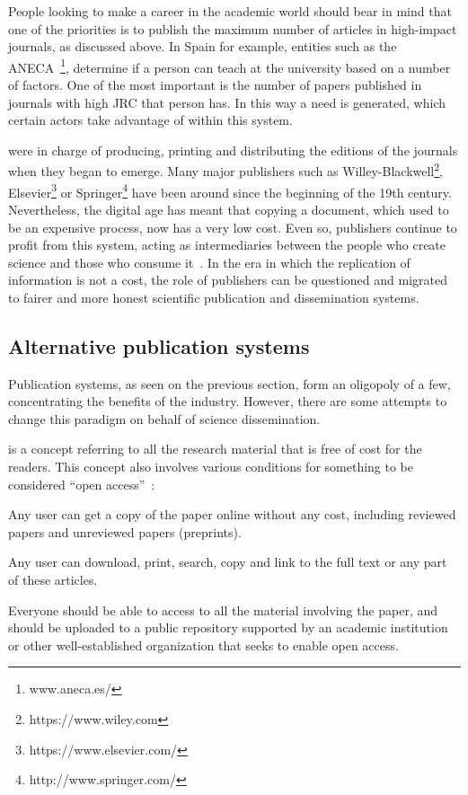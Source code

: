 People looking to make a career in the academic world should bear in mind that
one of the priorities is to publish the maximum number of articles in
high-impact journals, as discussed above. In Spain for example, entities such as
the ANECA~\footnote{www.aneca.es/}, determine if a person can teach at the
university based on a number of factors. One of the most important is the number
of papers published in journals with high JRC that person has. In this way a
need is generated, which certain actors take advantage of within this system.

 were in charge of producing, printing and distributing the
editions of the journals when they began to emerge. Many major publishers such
as Willey-Blackwell\footnote{https://www.wiley.com},
Elsevier\footnote{https://www.elsevier.com/} or
Springer\footnote{http://www.springer.com/} have been around since the beginning
of the 19th century. Nevertheless, the digital age has meant that copying a
document, which used to be an expensive process, now has a very low cost. Even
so, publishers continue to profit from this system, acting as intermediaries
between the people who create science and those who consume
it~\cite{lariviere2015oligopoly}. In the era in which the replication of
information is not a cost, the role of publishers can be questioned and migrated
to fairer and more honest scientific publication and dissemination systems.

\subsection{Alternative publication systems}
\label{soa:aps}

Publication systems, as seen on the previous section, form an oligopoly of a
few, concentrating the benefits of the industry. However, there are some
attempts to change this paradigm on behalf of science dissemination.

 is a concept referring to all the research material that is
free of cost for the readers. This concept also involves various conditions for
something to be considered ``open access''~\cite{bailey2007open}:

\begin{itemize}
  
   Any user can get a copy of the paper online
  without any cost, including reviewed papers and unreviewed papers (preprints).
  
   Any user can download, print, search, copy and link to
  the full text or any part of these articles.

   Everyone should be able to access to all the material
  involving the paper, and should be uploaded to a public repository supported
  by an academic institution or other well-established organization that seeks
  to enable open access.
\end{itemize}

